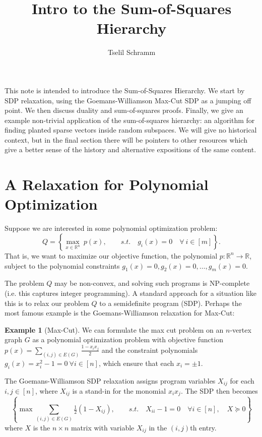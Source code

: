 \documentclass[a4paper,11pt]{article}
\title{Intro to the Sum-of-Squares Hierarchy}
\author{Tselil Schramm}
\date{}
\newcommand{\R}{\mathbb{R}}
\theoremstyle{definition}
\newtheorem{example}{Example}
\begin{document}
\maketitle

This note is intended to introduce the Sum-of-Squares Hierarchy.
We start by SDP relaxation, using the Goemans-Williamson Max-Cut SDP as a jumping off point. 
We then discuss duality and sum-of-squares proofs.
Finally, we give an example non-trivial application of the sum-of-squares hierarchy: an algorithm for finding planted sparse vectors inside random subspaces.
We will give no historical context, but in the final section there will be pointers to other resources which give a better sense of the history and alternative expositions of the same content.

\section{A Relaxation for Polynomial Optimization}

Suppose we are interested in some polynomial optimization problem:
\[
Q 
= \left\{\max_{x \in \R^n}\ p(x),\qquad 
s.t.\quad g_i(x) = 0 \quad \forall\ i \in [m]\right\}.
\]
That is, we want to maximize our objective function, the polynomial $p:\R^n\to \R$, subject to the polynomial constraints $g_1(x) = 0, g_2(x) = 0,\ldots, g_m(x) = 0$.

The problem $Q$ may be non-convex, and solving such programs is NP-complete (i.e. this captures integer programming).
A standard approach for a situation like this is to relax our problem $Q$ to a semidefinite program (SDP). 
Perhaps the most famous example is the Goemans-Williamson relaxation for Max-Cut:

\begin{example}[Max-Cut]
We can formulate the max cut problem on an $n$-vertex graph $G$ as a polynomial optimization problem with objective function $p(x) = \sum_{(i,j) \in E(G)} \frac{1- x_i x_j}{2}$ and the constraint polynomials $g_i(x) = x_i^2 - 1 = 0\ \forall i\in[n]$, which ensure that each $x_i = \pm 1$.

The Goemans-Williamson SDP relaxation assigns program variables $X_{ij}$ for each $i,j \in [n]$, where $X_{ij}$ is a stand-in for the monomial $x_i x_j$.
The SDP then becomes
\[
\left\{
\max \sum_{(i,j) \in E(G)}\tfrac{1}{2}(1 - X_{ij}), \qquad s.t. \quad X_{ii} -1= 0\quad \forall i \in [n],\quad X \succeq 0 \right\}
\]
where $X$ is the $n \times n$ matrix with variable $X_{ij}$ in the $(i,j)$th entry.
\end{example}
\end{document}
